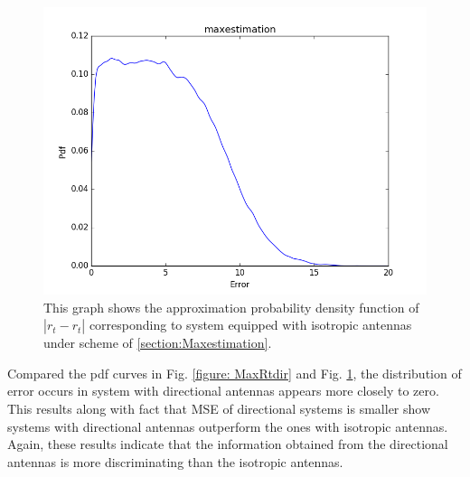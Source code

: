 \begin{figure}[]
	\centering
	\includegraphics[scale=0.5]{Figures/maxrtomni.png}
	\caption{This graph shows the approximation probability density function of $|r_{t}-\hat{r_{t}}|$ corresponding to system equipped with isotropic antennas under scheme of \ref{section:Maxestimation}. }
	\label{figure: MaxRtomni}
\end{figure}
Compared the pdf curves in Fig. \ref{figure: MaxRtdir} and Fig. \ref{figure: MaxRtomni}, the distribution of error occurs in system with directional antennas appears more closely to zero. This results along with fact that MSE of directional systems is smaller show systems with directional antennas outperform the ones with isotropic antennas. Again, these results indicate that the information obtained from the directional antennas is more discriminating than the isotropic antennas. 